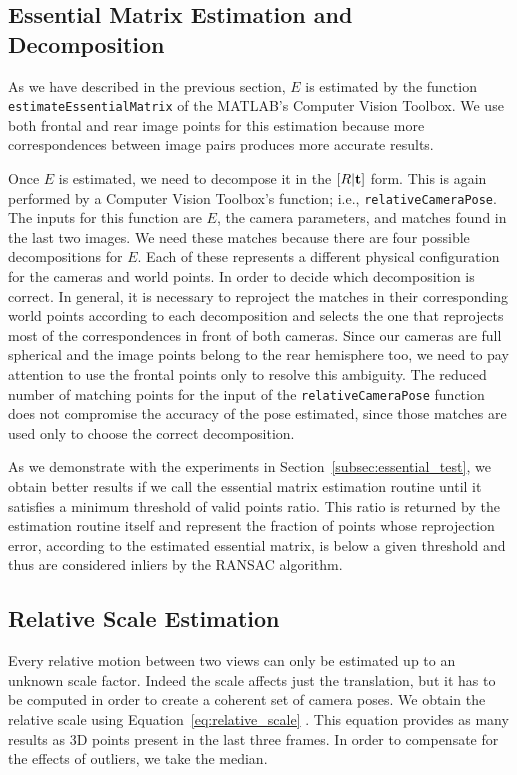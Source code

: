 \subsection{Essential Matrix Estimation and Decomposition}\label{subsec:essential_estimation}
As we have described in the previous section, $E$ is estimated 
by the function {\tt estimateEssentialMatrix} of the MATLAB's 
Computer Vision Toolbox.
We use both frontal and rear image points for this estimation because
more correspondences between image pairs produces more accurate results.

Once $E$ is estimated, we need to decompose it in the 
\( [R|\mathbf{t} ] \) form. This is again performed by a Computer Vision 
Toolbox's function; i.e., {\tt relativeCameraPose}.
The inputs for this function are $E$, the camera parameters, and matches found in the last two images.
We need these matches because there are four possible decompositions for $E$. Each of these represents a different physical configuration for the cameras and world points.
In order to decide which decomposition is correct. In general, it is necessary to reproject the matches in their corresponding world points according to each 
decomposition and selects the one that reprojects most of the correspondences in 
front of both cameras.
Since our cameras are full spherical and the image points belong to the 
rear hemisphere too, we need to pay attention to use the frontal points only to resolve this ambiguity. 
The reduced number of matching points for the input of the 
{\tt relativeCameraPose} function does not compromise the accuracy of the pose 
estimated, since those matches are used only to choose the 
correct decomposition.

As we demonstrate with the experiments in Section~\ref{subsec:essential_test}, we obtain better
results if we call the essential matrix estimation routine until it satisfies
a minimum threshold of valid points ratio. This ratio is returned by the
estimation routine itself and represent the fraction of points whose
reprojection error, according to the estimated essential matrix,
is below a given threshold and thus are
considered inliers by the RANSAC algorithm.

\subsection{Relative Scale Estimation}
Every relative motion between two views can only be estimated up to an unknown 
scale factor. Indeed the scale affects just the translation, but it has to 
be computed in order to create a coherent set of camera poses.
We obtain the relative scale using 
Equation~\ref{eq:relative_scale} \cite{scaramuzzaVisualOdometryI}.
This equation provides as many results as 3D points present in the last three
frames. In order to compensate for the effects of outliers, we take the 
median.

